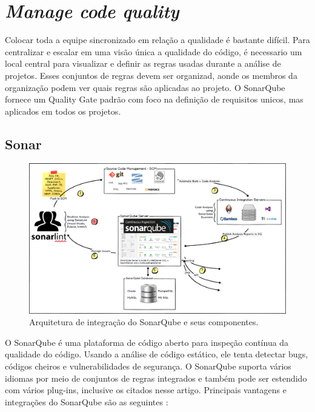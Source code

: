 \documentclass[12pt]{article}
\begin{document}
\section{\textit{Manage code quality}} \label{sec:managecodequality}

Colocar toda a equipe sincronizado em relação a qualidade é bastante difícil. Para centralizar e escalar em uma visão única a qualidade do código, é necessario um local central para visualizar e definir as regras usadas durante a análise de projetos. Esses conjuntos de regras devem ser organizad, aonde os membros da organização podem ver quais regras são aplicadas ao projeto.
O SonarQube\cite{SONARQUBE} fornece um Quality Gate padrão com foco na definição de requisitos unicos, mas aplicados em todos os projetos.

\subsection{Sonar} \label{sec:sonar}



\begin{figure}[h]
	\centering
		\includegraphics[scale=0.25]{img/img-sonar.png}
	\caption{Arquitetura\cite{SONARQUBE} de integração do SonarQube e seus componentes.}
	\label{fig:sonar-arquitetura}
\end{figure}


O SonarQube\cite{SONAR} é uma plataforma de código aberto para inspeção contínua da qualidade do código. Usando a análise de código estático, ele tenta detectar bugs, códigos cheiros e vulnerabilidades de segurança. O SonarQube suporta vários idiomas por meio de conjuntos de regras integrados e também pode ser estendido com vários plug-ins, inclusive os citados nesse artigo.
Principais vantagens e integrações do SonarQube são as seguintes \cite{SONARQUBE_IN_ACTION}:
\end{document}
